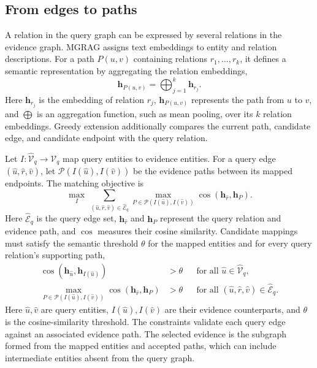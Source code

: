\subsection{From edges to paths}

A relation in the query graph can be expressed by several relations in the evidence graph. MGRAG assigns text embeddings to entity and relation descriptions. For a path $P(u,v)$ containing relations $r_1,\ldots,r_k$, it defines a semantic representation by aggregating the relation embeddings,
\begin{equation}
 \mathbf h_{P(u,v)}=\bigoplus_{j=1}^{k}\mathbf h_{r_j}.
\label{eq:mgrag:path-embedding}
\end{equation}
Here $\mathbf h_{r_j}$ is the embedding of relation $r_j$, $\mathbf h_{P(u,v)}$ represents the path from $u$ to $v$, and $\bigoplus$ is an aggregation function, such as mean pooling, over its $k$ relation embeddings. Greedy extension additionally compares the current path, candidate edge, and candidate endpoint with the query relation.

Let $I:\widehat{\mathcal V}_q\rightarrow\mathcal V_q$ map query entities to evidence entities. For a query edge $(\widehat u,\widehat r,\widehat v)$, let $\mathcal P(I(\widehat u),I(\widehat v))$ be the evidence paths between its mapped endpoints. The matching objective is
\begin{equation}
\max_I\ \sum_{(\widehat u,\widehat r,\widehat v)\in\widehat{\mathcal E}_q}
 \max_{P\in\mathcal P(I(\widehat u),I(\widehat v))}
 \cos(\mathbf h_{\widehat r},\mathbf h_P).
\label{eq:mgrag:matching-objective}
\end{equation}
Here $\widehat{\mathcal E}_q$ is the query edge set, $\mathbf h_{\widehat r}$ and $\mathbf h_P$ represent the query relation and evidence path, and $\cos$ measures their cosine similarity. Candidate mappings must satisfy the semantic threshold $\theta$ for the mapped entities and for every query relation's supporting path,
\begin{align}
 \cos(\mathbf h_{\widehat u},\mathbf h_{I(\widehat u)})&>\theta
 &&\text{for all }\widehat u\in\widehat{\mathcal V}_q,\\
 \max_{P\in\mathcal P(I(\widehat u),I(\widehat v))}\cos(\mathbf h_{\widehat r},\mathbf h_P)&>\theta
 &&\text{for all }(\widehat u,\widehat r,\widehat v)\in\widehat{\mathcal E}_q.
\label{eq:mgrag:matching-constraints}
\end{align}
Here $\widehat u,\widehat v$ are query entities, $I(\widehat u),I(\widehat v)$ are their evidence counterparts, and $\theta$ is the cosine-similarity threshold. The constraints validate each query edge against an associated evidence path. The selected evidence is the subgraph formed from the mapped entities and accepted paths, which can include intermediate entities absent from the query graph.

